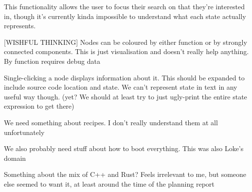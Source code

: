 This functionality allows the user to focus their search on that
they're interested in, though it's currently kinda impossible to
understand what each state actually represents.

[WISHFUL THINKING]
Nodes can be coloured by either function or by strongly connected
components. This is just visualisation and doesn't really help
anything. By function requires debug data

Single-clicking a node displays information about it. This should be
expanded to include source code location and state. We can't represent
state in text in any useful way though. (yet? We should at least try
to just ugly-print the entire state expression to get there)

We need something about recipes. I don't really understand them at all
unfortunately

We also probably need stuff about how to boot everything. This was
also Loke's domain

Something about the mix of C++ and Rust? Feels irrelevant to me, but
someone else seemed to want it, at least around the time of the
planning report
